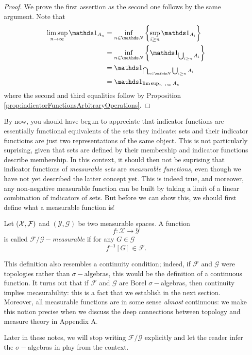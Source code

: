 \begin{proof}
We prove the first assertion as the second one follows by the same
argument. Note that
\begin{align*}
\limsup_{n\to\infty}\indicate_{A_{n}} & =\inf_{n\in\N}\left\{ \sup_{i\geq n}\indicate_{A_{i}}\right\} \\
 & =\inf_{n\in\N}\left\{ \indicate_{\bigcup_{i\geq n}A_{i}}\right\} \\
 & =\indicate_{\bigcap_{n\in\N}\bigcup_{i\geq n}A_{i}}\\
 & =\indicate_{\limsup_{n\to\infty}A_{n}}
\end{align*}
where the second and third equalities follow by Proposition \ref{prop:indicatorFunctionsArbitraryOperations}.
\end{proof}
By now, you should have begun to appreciate that indicator functions
are essentially functional equivalents of the sets they indicate:
sets and their indicator functioins are just two representations of
the same object. This is not particularly suprising, given that sets
are defined by their membership and indicator functions describe membership.
In this context, it should then not be suprising that indicator functions
of \emph{measurable sets }are \emph{measurable functions},\emph{ }even
though we have not yet described the latter concept yet. This is indeed
true, and moreover, any non-negative measurable function can be built
by taking a limit of a linear combination of indicators of sets. But
before we can show this, we should first define what a measurable
function is!
\begin{defn}
\label{def:measurableFunction}Let $\left(\mathcal{X},\mathcal{F}\right)$
and $\left(\mathcal{Y},\mathcal{G}\right)$ be two measurable spaces.
A function 
\[
f:\mathcal{X}\longrightarrow\mathcal{Y}
\]
is called \emph{$\mathcal{F}/\mathcal{G}-$measurable }if for any
$G\in\mathcal{G}$
\[
f^{-1}\left[G\right]\in\mathcal{F}.
\]
\end{defn}

\begin{rem*}
This definition also resembles a continuity condition; indeed, if
$\mathcal{F}$ and $\mathcal{G}$ were topologies rather than $\sigma-$algebras,
this would be the definition of a continuous function. It turns out
that if $\mathcal{F}$ and $\mathcal{G}$ are Borel $\sigma-$algebras,
then continuity implies measurability: this is a fact that we establish
in the next section. Moreover, all measurable functions are in some
sense \emph{almost }continuous: we make this notion precise when we
discuss the deep connections between topology and measure theory in
Appendix A.
\end{rem*}
Later in these notes, we will stop writing $\mathcal{F}/\mathcal{G}$
explicitly and let the reader infer the $\sigma-$algebras in play
from the context.

